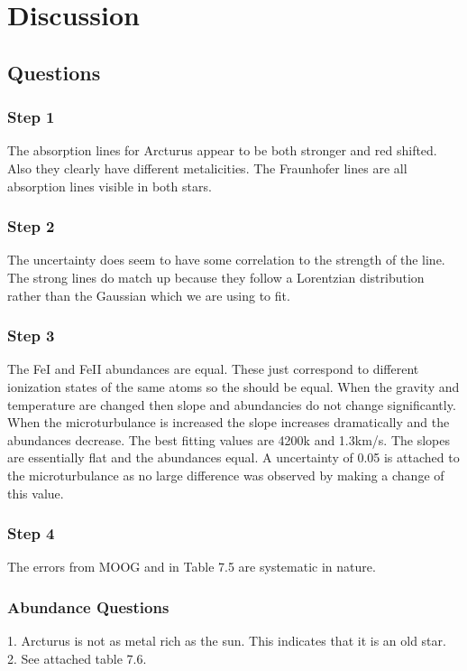 \documentclass{article}
\begin{document}
\section{Discussion}
\subsection{Questions}
\subsubsection{Step 1}
The absorption lines for Arcturus appear to be both stronger and red shifted. Also they clearly have different metalicities. The Fraunhofer lines are all absorption lines visible in both stars. 
\subsubsection{Step 2}
The uncertainty does seem to have some correlation to the strength of the line. The strong lines do match up because they follow a Lorentzian distribution rather than the Gaussian which we are using to fit.
\subsubsection{Step 3}
The FeI and FeII abundances are equal. These just correspond to different ionization states of the same atoms so the should be equal. When the gravity and temperature are changed then slope and abundancies do not change significantly. When the microturbulance is increased the slope increases dramatically and the abundances decrease. The best fitting values are 4200k and 1.3km/s. The slopes are essentially flat and the abundances equal. A uncertainty of 0.05 is attached to the microturbulance as no large difference was observed by making a change of this value.
\subsubsection{Step 4}
The errors from MOOG and in Table 7.5 are systematic in nature.
\subsubsection{Abundance Questions}
1. Arcturus is not as metal rich as the sun. This indicates that it is an old star.\\

2. See attached table 7.6.\\
\end{document}
